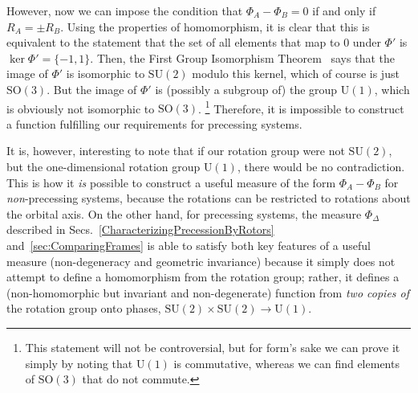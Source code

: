 \documentclass[aps,prd,amsmath,floatfix,twocolumn,superscriptaddress,nofootinbib,showpacs]{revtex4-1}
\newcommand{\U}{\ensuremath{\mathrm{U}}}
\newcommand{\SU}{\ensuremath{\mathrm{SU}}}
\newcommand{\SO}{\ensuremath{\mathrm{SO}}}
\begin{document}
However, now we can impose the condition that $\Phi_{A}-\Phi_{B} = 0$
if and only if $R_{A} = \pm R_{B}$.  Using the properties of
homomorphism, it is clear that this is equivalent to the statement
that the set of all elements that map to $0$ under $\Phi'$ is
$\ker \Phi' = \{-1,1\}$.
Then, the First Group Isomorphism Theorem~\cite{DummitFoote:1999} says
that the image of $\Phi'$ is isomorphic to $\SU(2)$ modulo this
kernel, which of course is just $\SO(3)$.  But the image of $\Phi'$ is
(possibly a subgroup of) the group $\U(1)$, which is obviously not
isomorphic to $\SO(3)$.%
\footnote{This statement will not be controversial, but for form's
  sake we can prove it simply by noting that $\U(1)$ is commutative,
  whereas we can find elements of $\SO(3)$ that do not commute.} %
Therefore, it is impossible to construct a function fulfilling our
requirements for precessing systems.

It is, however, interesting to note that if our rotation group were
not $\SU(2)$, but the one-dimensional rotation group $\U(1)$, there
would be no contradiction.  This is how it \emph{is} possible to
construct a useful measure of the form $\Phi_{A}-\Phi_{B}$ for
\emph{non}-precessing systems, because the rotations can be restricted
to rotations about the orbital axis.  On the other hand, for
precessing systems, the measure $\Phi_{\Delta}$ described in
Secs.~\ref{CharacterizingPrecessionByRotors}
and~\ref{sec:ComparingFrames} is able to satisfy both key features of
a useful measure (non-degeneracy and geometric invariance) because it
simply does not attempt to define a homomorphism from the rotation
group; rather, it defines a (non-homomorphic but invariant and
non-degenerate) function from \emph{two copies of} the rotation group
onto phases, $\SU(2) \times \SU(2) \to \U(1)$.








\end{document}
